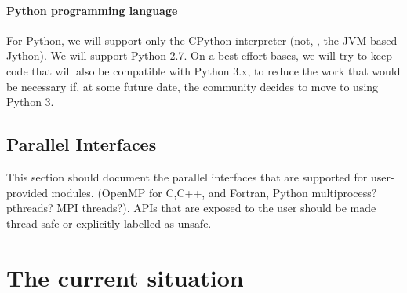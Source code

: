 \documentclass[draftmode,draftwater]{memarticle}
\begin{document}
\subsubsection{Python programming language}

For Python, we will support only the CPython interpreter (not, \eg, the
JVM-based Jython). We will support Python 2.7. On a best-effort bases,
we will try to keep code that will also be compatible with Python 3.x,
to reduce the work that would be necessary if, at some future date, the
community decides to move to using Python 3.

\section{Parallel Interfaces}

This section should document the parallel interfaces that are supported for
user-provided modules.  (OpenMP for C,C++, and Fortran, Python multiprocess? pthreads? MPI threads?).
APIs that are exposed to the user should be made thread-safe or explicitly labelled
as unsafe.


\chapter{The current situation\label{ch:current_situation}}
\end{document}
